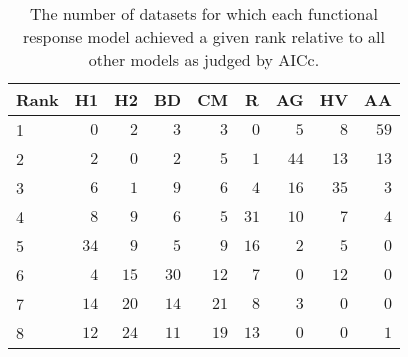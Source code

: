 \begin{table}[!tbp]
\caption{The number of datasets for which each functional response model achieved a given rank relative to all other models as judged by AICc.\label{table:AICc_rankings}} 
\begin{center}
\begin{tabular}{lrrrrrrrr}
\hline\hline
\multicolumn{1}{l}{Rank}&\multicolumn{1}{c}{H1}&\multicolumn{1}{c}{H2}&\multicolumn{1}{c}{BD}&\multicolumn{1}{c}{CM}&\multicolumn{1}{c}{R}&\multicolumn{1}{c}{AG}&\multicolumn{1}{c}{HV}&\multicolumn{1}{c}{AA}\tabularnewline
\hline
1&$ 0$&$ 2$&$ 3$&$ 3$&$ 0$&$ 5$&$ 8$&$59$\tabularnewline
2&$ 2$&$ 0$&$ 2$&$ 5$&$ 1$&$44$&$13$&$13$\tabularnewline
3&$ 6$&$ 1$&$ 9$&$ 6$&$ 4$&$16$&$35$&$ 3$\tabularnewline
4&$ 8$&$ 9$&$ 6$&$ 5$&$31$&$10$&$ 7$&$ 4$\tabularnewline
5&$34$&$ 9$&$ 5$&$ 9$&$16$&$ 2$&$ 5$&$ 0$\tabularnewline
6&$ 4$&$15$&$30$&$12$&$ 7$&$ 0$&$12$&$ 0$\tabularnewline
7&$14$&$20$&$14$&$21$&$ 8$&$ 3$&$ 0$&$ 0$\tabularnewline
8&$12$&$24$&$11$&$19$&$13$&$ 0$&$ 0$&$ 1$\tabularnewline
\hline
\end{tabular}\end{center}
\end{table}
